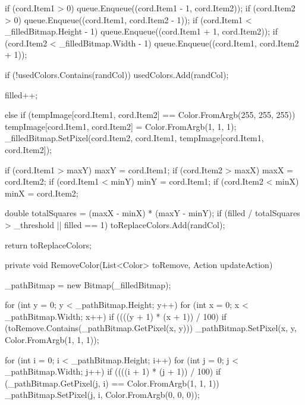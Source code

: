 \begin{flushleft}
\begin{cscode}
{{{{{{                        if (cord.Item1 > 0) queue.Enqueue((cord.Item1 - 1, cord.Item2));
                        if (cord.Item2 > 0) queue.Enqueue((cord.Item1, cord.Item2 - 1));
                        if (cord.Item1 < _filledBitmap.Height - 1) queue.Enqueue((cord.Item1 + 1, cord.Item2));
                        if (cord.Item2 < _filledBitmap.Width - 1) queue.Enqueue((cord.Item1, cord.Item2 + 1));

                        if (!usedColors.Contains(randCol)) usedColors.Add(randCol);

                        filled++;
                    }
                    else if (tempImage[cord.Item1, cord.Item2] == Color.FromArgb(255, 255, 255))
                    {
                        tempImage[cord.Item1, cord.Item2] = Color.FromArgb(1, 1, 1);
                        _filledBitmap.SetPixel(cord.Item2, cord.Item1, tempImage[cord.Item1, cord.Item2]);
                    }

                    if (cord.Item1 > maxY) maxY = cord.Item1;
                    if (cord.Item2 > maxX) maxX = cord.Item2;
                    if (cord.Item1 < minY) minY = cord.Item1;
                    if (cord.Item2 < minX) minX = cord.Item2;
                }

                double totalSquares = (maxX - minX) * (maxY - minY);
                if (filled / totalSquares > _threshold || filled == 1) toReplaceColors.Add(randCol);
            }
        }

        return toReplaceColors;
    }

    private void RemoveColor(List<Color> toRemove, Action updateAction)
    {
        _pathBitmap = new Bitmap(_filledBitmap);

        for (int y = 0; y < _pathBitmap.Height; y++)
        {
            for (int x = 0; x < _pathBitmap.Width; x++)
            {
                if ((((y + 1) * (x + 1)) / 100) %
                if (toRemove.Contains(_pathBitmap.GetPixel(x, y)))
                {
                    _pathBitmap.SetPixel(x, y, Color.FromArgb(1, 1, 1));
                }
            }
        }

        for (int i = 0; i < _pathBitmap.Height; i++)
        {
            for (int j = 0; j < _pathBitmap.Width; j++)
            {
                if ((((i + 1) * (j + 1)) / 100) %
                if (_pathBitmap.GetPixel(j, i) == Color.FromArgb(1, 1, 1))
                    _pathBitmap.SetPixel(j, i, Color.FromArgb(0, 0, 0));
            }
        }
    }

}
\end{cscode}
\end{flushleft}
